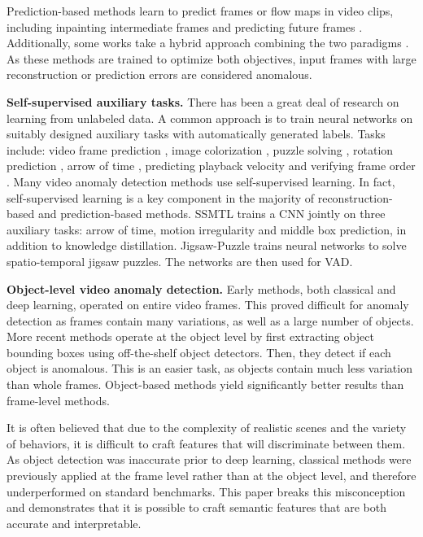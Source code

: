 \documentclass[10pt,twocolumn,letterpaper]{article}
\begin{document}
Prediction-based methods learn to predict frames or flow maps in video clips, including inpainting intermediate frames and predicting future frames \cite{shanghaitech,prediction_1,prediction_2,lee2019bman,prediction_3,Park2020LearningMN,prediction_4,Feng2021ConvolutionalTB,yu2020cloze}. Additionally, some works take a hybrid approach combining the two paradigms \cite{vad_iccv_2021,hybrid_1,hybrid_2,hybrid_3,hybrid_4}. As these methods are trained to optimize both objectives, input frames with large reconstruction or prediction errors are considered anomalous.

\textbf{Self-supervised auxiliary tasks.} There has been a great deal of research on learning from unlabeled data. A common approach is to train neural networks on suitably designed auxiliary tasks with automatically generated labels. Tasks include: video frame prediction \cite{mathieu2015deep}, image colorization \cite{zhang2016colorful,larsson2016learning}, puzzle solving \cite{noroozi2016unsupervised}, rotation prediction \cite{gidaris2018unsupervised}, arrow of time \cite{arrow_of_time}, predicting playback velocity \cite{playback_speed} and verifying frame order \cite{frame_order}. Many video anomaly detection methods use self-supervised learning. In fact, self-supervised learning is a key component in the majority of reconstruction-based and prediction-based methods. SSMTL \cite{Georgescu2021AnomalyDI} trains a CNN jointly on three auxiliary tasks: arrow of time, motion irregularity and middle box prediction, in addition to knowledge distillation. Jigsaw-Puzzle \cite{jigsaw_puzzles_eccv2022} trains neural networks to solve spatio-temporal jigsaw puzzles. The networks are then used for VAD.

\textbf{Object-level video anomaly detection.}  Early methods, both classical and deep learning, operated on entire video frames. This proved difficult for anomaly detection as frames contain many variations, as well as a large number of objects. More recent methods \cite{Georgescu2021AnomalyDI,vad_iccv_2021,jigsaw_puzzles_eccv2022} operate at the object level by first extracting object bounding boxes using off-the-shelf object detectors. Then, they detect if each object is anomalous. This is an easier task, as objects contain much less variation than whole frames. Object-based methods yield significantly better results than frame-level methods. 

It is often believed that due to the complexity of realistic scenes and the variety of behaviors, it is difficult to craft features that will discriminate between them. As object detection was inaccurate prior to deep learning, classical methods were previously applied at the frame level rather than at the object level, and therefore underperformed on standard benchmarks. This paper breaks this misconception and demonstrates that it is possible to craft semantic features that are both accurate and interpretable.
\end{document}
